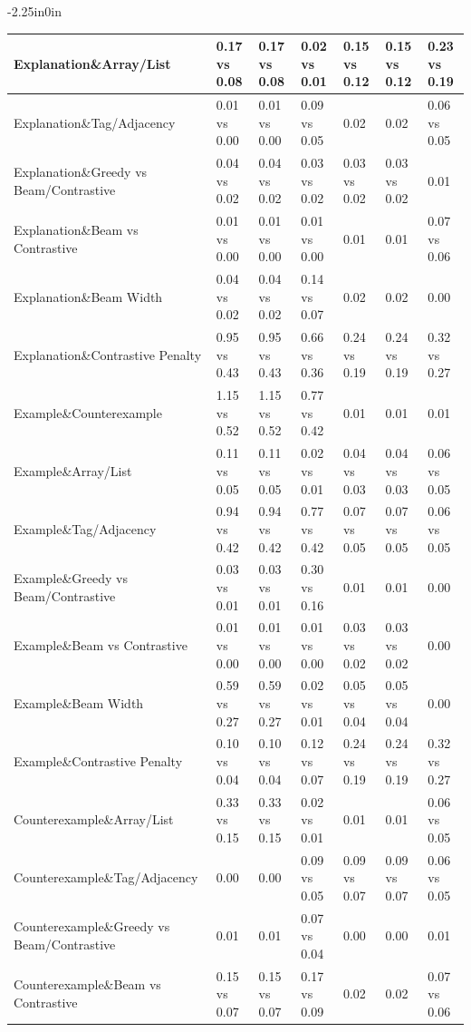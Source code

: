 \begin{table}[h]
\begin{adjustwidth}{-2.25in}{0in}
{\begin{tabular}{|l|lll|lll|}
\hline
Explanation\&Array/List & 0.17 vs 0.08 & 0.17 vs 0.08 & 0.02 vs 0.01 & 0.15 vs 0.12 & 0.15 vs 0.12 & 0.23 vs 0.19 \\
\hline
Explanation\&Tag/Adjacency & 0.01 vs 0.00 & 0.01 vs 0.00 & 0.09 vs 0.05 & 0.02 & 0.02 & 0.06 vs 0.05 \\
\hline
Explanation\&Greedy vs Beam/Contrastive & 0.04 vs 0.02 & 0.04 vs 0.02 & 0.03 vs 0.02 & 0.03 vs 0.02 & 0.03 vs 0.02 & 0.01 \\
\hline
Explanation\&Beam vs Contrastive & 0.01 vs 0.00 & 0.01 vs 0.00 & 0.01 vs 0.00 & 0.01 & 0.01 & 0.07 vs 0.06 \\
\hline
Explanation\&Beam Width & 0.04 vs 0.02 & 0.04 vs 0.02 & 0.14 vs 0.07 & 0.02 & 0.02 & 0.00 \\
\hline
Explanation\&Contrastive Penalty & 0.95 vs 0.43 & 0.95 vs 0.43 & 0.66 vs 0.36 & 0.24 vs 0.19 & 0.24 vs 0.19 & 0.32 vs 0.27 \\
\hline
Example\&Counterexample & 1.15 vs 0.52 & 1.15 vs 0.52 & 0.77 vs 0.42 & 0.01 & 0.01 & 0.01 \\
\hline
Example\&Array/List & 0.11 vs 0.05 & 0.11 vs 0.05 & 0.02 vs 0.01 & 0.04 vs 0.03 & 0.04 vs 0.03 & 0.06 vs 0.05 \\
\hline
Example\&Tag/Adjacency & 0.94 vs 0.42 & 0.94 vs 0.42 & 0.77 vs 0.42 & 0.07 vs 0.05 & 0.07 vs 0.05 & 0.06 vs 0.05 \\
\hline
Example\&Greedy vs Beam/Contrastive & 0.03 vs 0.01 & 0.03 vs 0.01 & 0.30 vs 0.16 & 0.01 & 0.01 & 0.00 \\
\hline
Example\&Beam vs Contrastive & 0.01 vs 0.00 & 0.01 vs 0.00 & 0.01 vs 0.00 & 0.03 vs 0.02 & 0.03 vs 0.02 & 0.00 \\
\hline
Example\&Beam Width & 0.59 vs 0.27 & 0.59 vs 0.27 & 0.02 vs 0.01 & 0.05 vs 0.04 & 0.05 vs 0.04 & 0.00 \\
\hline
Example\&Contrastive Penalty & 0.10 vs 0.04 & 0.10 vs 0.04 & 0.12 vs 0.07 & 0.24 vs 0.19 & 0.24 vs 0.19 & 0.32 vs 0.27 \\
\hline
Counterexample\&Array/List & 0.33 vs 0.15 & 0.33 vs 0.15 & 0.02 vs 0.01 & 0.01 & 0.01 & 0.06 vs 0.05 \\
\hline
Counterexample\&Tag/Adjacency & 0.00 & 0.00 & 0.09 vs 0.05 & 0.09 vs 0.07 & 0.09 vs 0.07 & 0.06 vs 0.05 \\
\hline
Counterexample\&Greedy vs Beam/Contrastive & 0.01 & 0.01 & 0.07 vs 0.04 & 0.00 & 0.00 & 0.01 \\
\hline
Counterexample\&Beam vs Contrastive & 0.15 vs 0.07 & 0.15 vs 0.07 & 0.17 vs 0.09 & 0.02 & 0.02 & 0.07 vs 0.06 \\

\end{tabular}}
\end{adjustwidth}
\end{table}
